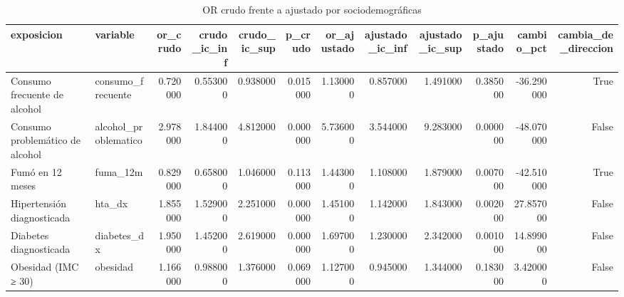 \begin{table}[htbp]
\caption{OR crudo frente a ajustado por sociodemográficas}
\label{tab:tabla_21_modelos_por_bloques}
\begin{tabular}{llrrrrrrrrrr}
\toprule
exposicion & variable & or\_crudo & crudo\_ic\_inf & crudo\_ic\_sup & p\_crudo & or\_ajustado & ajustado\_ic\_inf & ajustado\_ic\_sup & p\_ajustado & cambio\_pct & cambia\_de\_direccion \\
\midrule
Consumo frecuente de alcohol & consumo\_frecuente & 0.720000 & 0.553000 & 0.938000 & 0.015000 & 1.130000 & 0.857000 & 1.491000 & 0.385000 & -36.290000 & True \\
Consumo problemático de alcohol & alcohol\_problematico & 2.978000 & 1.844000 & 4.812000 & 0.000000 & 5.736000 & 3.544000 & 9.283000 & 0.000000 & -48.070000 & False \\
Fumó en 12 meses & fuma\_12m & 0.829000 & 0.658000 & 1.046000 & 0.113000 & 1.443000 & 1.108000 & 1.879000 & 0.007000 & -42.510000 & True \\
Hipertensión diagnosticada & hta\_dx & 1.855000 & 1.529000 & 2.251000 & 0.000000 & 1.451000 & 1.142000 & 1.843000 & 0.002000 & 27.857000 & False \\
Diabetes diagnosticada & diabetes\_dx & 1.950000 & 1.452000 & 2.619000 & 0.000000 & 1.697000 & 1.230000 & 2.342000 & 0.001000 & 14.899000 & False \\
Obesidad (IMC ≥ 30) & obesidad & 1.166000 & 0.988000 & 1.376000 & 0.069000 & 1.127000 & 0.945000 & 1.344000 & 0.183000 & 3.420000 & False \\
\bottomrule
\end{tabular}
\end{table}
